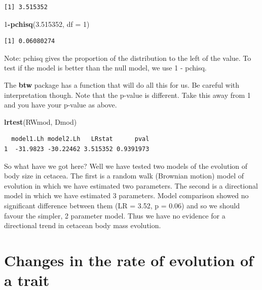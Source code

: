 \documentclass[
]{book}
\newenvironment{Shaded}{\begin{snugshade}}{\end{snugshade}}
\newcommand{\DataTypeTok}[1]{\textcolor[rgb]{0.13,0.29,0.53}{#1}}
\newcommand{\DecValTok}[1]{\textcolor[rgb]{0.00,0.00,0.81}{#1}}
\newcommand{\FloatTok}[1]{\textcolor[rgb]{0.00,0.00,0.81}{#1}}
\newcommand{\KeywordTok}[1]{\textcolor[rgb]{0.13,0.29,0.53}{\textbf{#1}}}
\newcommand{\NormalTok}[1]{#1}
\newcommand{\OperatorTok}[1]{\textcolor[rgb]{0.81,0.36,0.00}{\textbf{#1}}}
\begin{document}
\begin{verbatim}
[1] 3.515352
\end{verbatim}

\begin{Shaded}
\begin{Highlighting}[]
\DecValTok{1}\OperatorTok{{-}}\KeywordTok{pchisq}\NormalTok{(}\FloatTok{3.515352}\NormalTok{, }\DataTypeTok{df =} \DecValTok{1}\NormalTok{) }
\end{Highlighting}
\end{Shaded}

\begin{verbatim}
[1] 0.06080274
\end{verbatim}

Note: pchisq gives the proportion of the distribution to the left of the value. To test if the model is better than the null model, we use 1 - pchisq.

The \textbf{btw} package has a function that will do all this for us. Be careful with interpretation though. Note that the p-value is different. Take this away from 1 and you have your p-value as above.

\begin{Shaded}
\begin{Highlighting}[]
\KeywordTok{lrtest}\NormalTok{(RWmod, Dmod)}
\end{Highlighting}
\end{Shaded}

\begin{verbatim}
  model1.Lh model2.Lh   LRstat      pval
1  -31.9823 -30.22462 3.515352 0.9391973
\end{verbatim}

So what have we got here? Well we have tested two models of the evolution of body size in cetacea. The first is a random walk (Brownian motion) model of evolution in which we have estimated two parameters. The second is a directional model in which we have estimated 3 parameters. Model comparison showed no significant difference between them (LR = 3.52, p = 0.06) and so we should favour the simpler, 2 parameter model. Thus we have no evidence for a directional trend in cetacean body mass evolution.

\hypertarget{changes-in-the-rate-of-evolution-of-a-trait}{%
\section{Changes in the rate of evolution of a trait}\label{changes-in-the-rate-of-evolution-of-a-trait}}
\end{document}
